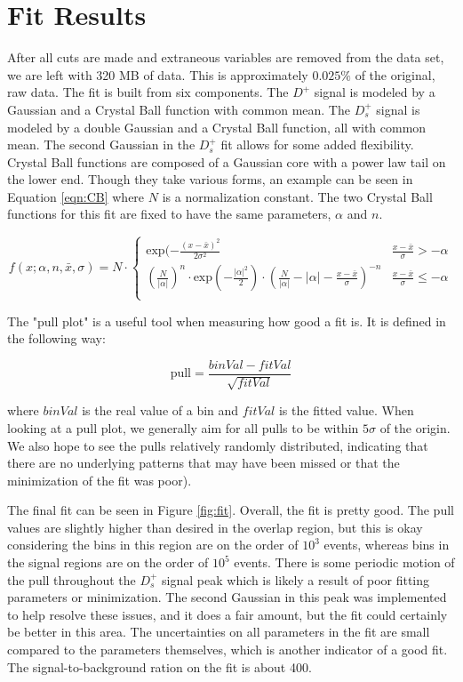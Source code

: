\documentclass[12pt, letterpaper]{article}
\begin{document}
\section{Fit Results}
After all cuts are made and extraneous variables are removed from the data set, we are left with 320 MB of data. This is approximately $0.025\%$ of the original, raw data. The fit is built from six components. The $D^+$ signal is modeled by a Gaussian and a Crystal Ball function with common mean. The $D^+_s$ signal is modeled by a double Gaussian and a Crystal Ball function, all with common mean. The second Gaussian in the $D^+_s$ fit allows for some added flexibility. Crystal Ball functions are composed of a Gaussian core with a power law tail on the lower end. Though they take various forms, an example can be seen in Equation \ref{eqn:CB} where $N$ is a normalization constant. The two Crystal Ball functions for this fit are fixed to have the same parameters, $\alpha$ and $n$. 

\begin{equation}
f(x; \alpha, n, \bar{x}, \sigma) = N \cdot
\begin{cases} 
      \text{exp}(-\frac{(x-\bar{x})^2}{2\sigma^2} & \frac{x - \bar{x}}{\sigma} > -\alpha \\
      (\frac{N}{|\alpha|})^n \cdot \text{exp}(-\frac{|\alpha|^2}{2}) \cdot (\frac{N}{|\alpha|} - |\alpha| - \frac{x - \bar{x}}{\sigma})^{-n}  & \frac{x - \bar{x}}{\sigma} \leq -\alpha \\
   \end{cases}
\label{eqn:CB}
\end{equation}

The "pull plot" is a useful tool when measuring how good a fit is. It is defined in the following way:

\begin{equation}
\text{pull} = \frac{binVal - fitVal}{\sqrt{fitVal}}
\label{eqn:pull}
\end{equation}

where $binVal$ is the real value of a bin and $fitVal$ is the fitted value. When looking at a pull plot, we generally aim for all pulls to be within $5 \sigma$ of the origin. We also hope to see the pulls relatively randomly distributed, indicating that there are no underlying patterns that may have been missed or that the minimization of the fit was poor). 

The final fit can be seen in Figure \ref{fig:fit}. Overall, the fit is pretty good. The pull values are slightly higher than desired in the overlap region, but this is okay considering the bins in this region are on the order of $10^3$ events, whereas bins in the signal regions are on the order of $10^5$ events. There is some periodic motion of the pull throughout the $D^+_s$ signal peak which is likely a result of poor fitting parameters or minimization. The second Gaussian in this peak was implemented to help resolve these issues, and it does a fair amount, but the fit could certainly be better in this area. The uncertainties on all parameters in the fit are small compared to the parameters themselves, which is another indicator of a good fit. The signal-to-background ration on the fit is about 400.
\end{document}
